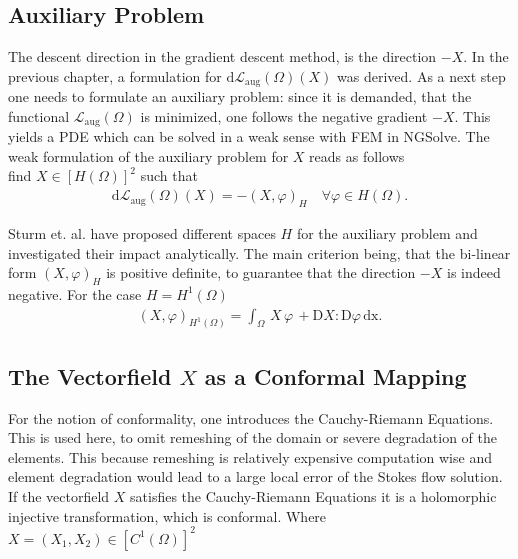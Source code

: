 \subsection{Auxiliary Problem}
The descent direction in the gradient descent method, is the direction $-X$.
In the previous chapter, a formulation for $\mathrm{d}\mathcal{L}_{\mathrm{aug}}(\Omega)(X)$
was derived. As a next step one needs to formulate an auxiliary problem: since it is demanded,
that the functional $\mathcal{L}_{\mathrm{aug}}(\Omega)$ is minimized, one follows the 
negative gradient $-X$. This yields a PDE which can be solved in a weak sense with FEM in NGSolve.
The weak formulation of the auxiliary problem for $X$ reads as follows \\

find $X \in [H(\Omega)]^2$ such that
\begin{align}
	\mathrm{d}\mathcal{L}_{\mathrm{aug}}(\Omega)(X) = -(X,\varphi)_H \quad \forall \varphi \in H(\Omega).
\end{align}

Sturm et. al. \cite{nearly_conformal_paper} have proposed different spaces $H$ for the auxiliary problem
and investigated their impact analytically. The main criterion being, that the bi-linear 
form $(X,\varphi)_H$ is positive definite,
to guarantee that the direction $-X$ is indeed negative. For the case $H=H^1(\Omega)$
\begin{align}
	(X,\varphi)_{H^1(\Omega)} = \int_{\Omega} \, X \, \varphi \, + \mathrm{D}X:\mathrm{D}\varphi \, \mathrm{dx}.
\end{align}

\subsection{The Vectorfield $X$ as a Conformal Mapping}
For the notion of conformality, one introduces the Cauchy-Riemann Equations. This is used here,
to omit remeshing of the domain or severe degradation of the elements.
This because remeshing is relatively expensive computation wise and element degradation
would lead to a large local error of the Stokes flow solution.
If the vectorfield $X$ satisfies the Cauchy-Riemann Equations it is a holomorphic injective 
transformation, which is conformal. Where $X = (X_1, X_2) \in [C^1(\Omega)]^2$

